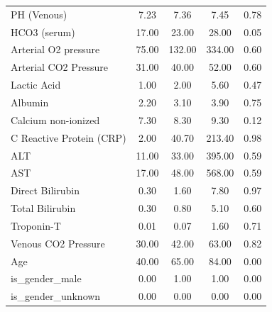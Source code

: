 \begin{table}[h!]
\begin{tabular}{lcccc}
    PH (Venous) & 7.23 & 7.36 & 7.45 & 0.78 \\
    HCO3 (serum) & 17.00 & 23.00 & 28.00 & 0.05 \\
    Arterial O2 pressure & 75.00 & 132.00 & 334.00 & 0.60 \\
    Arterial CO2 Pressure & 31.00 & 40.00 & 52.00 & 0.60 \\
    Lactic Acid & 1.00 & 2.00 & 5.60 & 0.47 \\
    Albumin & 2.20 & 3.10 & 3.90 & 0.75 \\
    Calcium non-ionized & 7.30 & 8.30 & 9.30 & 0.12 \\
    C Reactive Protein (CRP) & 2.00 & 40.70 & 213.40 & 0.98 \\
    ALT & 11.00 & 33.00 & 395.00 & 0.59 \\
    AST & 17.00 & 48.00 & 568.00 & 0.59 \\
    Direct Bilirubin & 0.30 & 1.60 & 7.80 & 0.97 \\
    Total Bilirubin & 0.30 & 0.80 & 5.10 & 0.60 \\
    Troponin-T & 0.01 & 0.07 & 1.60 & 0.71 \\
    Venous CO2 Pressure & 30.00 & 42.00 & 63.00 & 0.82 \\
    Age & 40.00 & 65.00 & 84.00 & 0.00 \\
    is\_gender\_male & 0.00 & 1.00 & 1.00 & 0.00 \\
    is\_gender\_unknown & 0.00 & 0.00 & 0.00 & 0.00 \\
    \bottomrule
\end{tabular}
\end{table}
